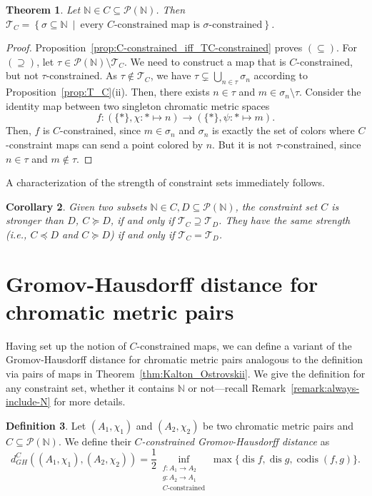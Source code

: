\documentclass[8pt,a4paper,oneside,english,english]{article}
\theoremstyle{plain}
\theoremstyle
{plain}
\newtheorem{theorem}{Theorem}[section]
\newtheorem{corollary}[theorem]{Corollary}%
\theoremstyle{definition}
\newtheorem{definition}[theorem]{Definition}%
\newcommand{\N}{\mathbb{N}}
\newcommand{\Tau}{\mathcal T}
\newcommand{\setdef}[2]{\left\{{#1} \ \middle|\ {#2}\right\}}
\newcommand{\GH}{d_{GH}}
\newcommand{\MP}[1]{(A_{#1},\chi_{#1})}
\DeclareMathOperator{\dis}{dis}
\DeclareMathOperator{\codis}{codis}
\begin{document}
\begin{theorem}\label{thm:all-constraints-are-alexandrov-topology}
    Let $\N\in C\subseteq\mathcal P(\N)$.
    Then $\Tau_C = \setdef{
            \sigma\subseteq\N
        }{
            \text{every $C$-constrained map is $\sigma$-constrained}
        }$.
\end{theorem}
\begin{proof}
    Proposition~\ref{prop:C-constrained_iff_TC-constrained} proves $(\subseteq)$. For $(\supseteq)$, let $\tau\in\mathcal P(\N)\setminus\Tau_C$. 
    We need to construct a map that is $C$-constrained, but not $\tau$-constrained. As $\tau\notin \Tau_C$, we have $\tau \subsetneq \bigcup_{n\in\tau}\sigma_n$ according to Proposition~\ref{prop:T_C}(ii). Then, there exists $n\in\tau$ and $m\in \sigma_n\setminus\tau$. Consider the identity map between two singleton chromatic metric spaces 
    \[
        f\colon(\{\ast\},\chi:\ast\mapsto n) \longrightarrow (\{\ast\},\psi:\ast\mapsto m).
    \]
    Then, $f$ is $C$-constrained, since $m\in\sigma_n$ and $\sigma_n$ is exactly the set of colors where $C$-constraint maps can send a point colored by $n$.
    But it is not $\tau$-constrained, since $n\in\tau$ and $m\notin\tau$.
\end{proof}

A characterization of the strength of constraint sets immediately follows.
\begin{corollary}\label{coro:constraints-strength-and-alexandrov-topology}
    Given two subsets $\N\in C,D\subseteq\mathcal P(\N)$, the constraint set $C$ is stronger than $D$, $C\succeq D$, if and only if $\Tau_C \supseteq \Tau_D$.
    They have the same strength (i.e., $C\preceq D$ and $C\succeq D$) if and only if $\Tau_C = \Tau_D$.
\end{corollary}


\section{Gromov-Hausdorff distance for chromatic metric pairs}\label{sec:C-constrained_GH}

Having set up the notion of $C$-constrained maps, we can define a variant of the Gromov-Hausdorff distance for chromatic metric pairs analogous to the definition via pairs of maps in Theorem~\ref{thm:Kalton_Ostrovskii}.
We give the definition for any constraint set, whether it contains $\N$ or not---recall Remark~\ref{remark:always-include-N} for more details.


\begin{definition}\label{def:C-constrained_GH}
	Let $\MP{1}$ and $\MP{2}$ be two chromatic metric pairs and $C\subseteq\mathcal P(\N)$. We define their {\em $C$-constrained Gromov-Hausdorff distance} as
	\[
	\GH^C(\MP{1},\MP{2})=\frac{1}{2}\inf_{\substack{f\colon A_1\to A_2\\g\colon A_2\to A_1\\\text{$C$-constrained}}}\max\{\dis f,\dis g,\codis(f,g)\}.
	\]
\end{definition}
\end{document}
